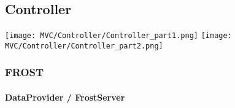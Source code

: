 \subsection{Controller}
\begin{landscape}
\texttt{[image: MVC/Controller/Controller\_part1.png]}
\newpage
\texttt{[image: MVC/Controller/Controller\_part2.png]}
\end{landscape}

\subsubsection{FROST}

\paragraph{DataProvider / FrostServer}\mbox{}\\

